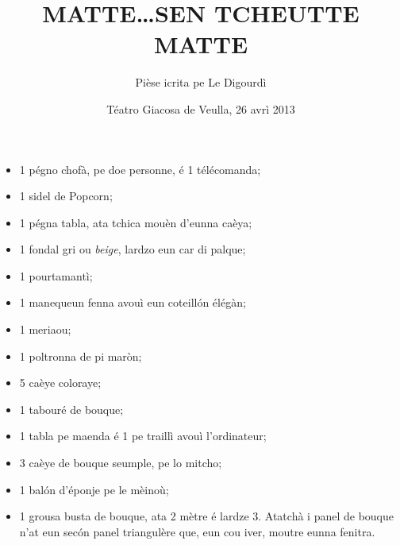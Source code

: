 \title{MATTE\ldots SEN TCHEUTTE MATTE}
\author{Pièse icrita pe Le Digourdì}
\date{Téatro Giacosa de Veulla, 26 avrì 2013}

\maketitle






\Scenographie
\begin{itemize}
\item[$\bullet$] 1 pégno chofà, pe doe personne, é 1 télécomanda;
\item[$\bullet$] 1 sidel de Popcorn;
\item[$\bullet$] 1 pégna tabla, ata tchica mouèn d'eunna caèya;
\item[$\bullet$] 1 fondal gri ou \textit{beige}, lardzo eun car di palque;
\item[$\bullet$] 1 pourtamantì;
\item[$\bullet$] 1 manequeun fenna avouì eun coteill\'on élégàn;
\item[$\bullet$] 1 meriaou;
\item[$\bullet$] 1 poltronna de pi maròn;
\item[$\bullet$] 5 caèye coloraye;
\item[$\bullet$] 1 tabouré de bouque;
\item[$\bullet$] 1 tabla pe maenda é 1 pe traillì avouì l'ordinateur;
\item[$\bullet$] 3 caèye de bouque seumple, pe lo mitcho;
\item[$\bullet$] 1 bal\'on d'éponje pe le mèinoù;
\item[$\bullet$] 1 grousa busta de bouque, ata 2 mètre é lardze 3. Atatchà i panel de bouque n'at eun sec\'on panel triangulère que, eun cou iver, moutre eunna fenitra.
\end{itemize}

\setlength{\lengthchar}{3.5cm}


